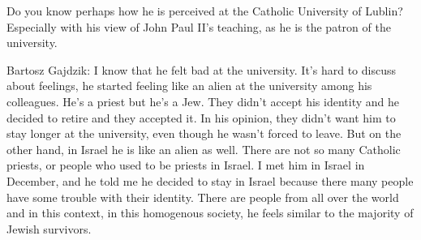 Do you know perhaps how he is perceived at the Catholic University of Lublin? Especially with his view of John Paul II’s teaching, as he is the patron of the university.  

Bartosz Gajdzik:  I know that he felt bad at the university. It’s hard to discuss about feelings, he started feeling like an alien at the university among his colleagues. He’s a priest but he’s a Jew. They didn’t accept his identity and he decided to retire and they accepted it. In his opinion, they didn’t want him to stay longer at the university, even though he wasn’t forced to leave. But on the other hand, in Israel he is like an alien as well. There are not so many Catholic priests, or people who used to be priests in Israel. I met him in Israel in December, and he told me he decided to stay in Israel because there many people have some trouble with their identity. There are people from all over the world and in this context, in this homogenous society, he feels similar to the majority of Jewish survivors.  

 

 